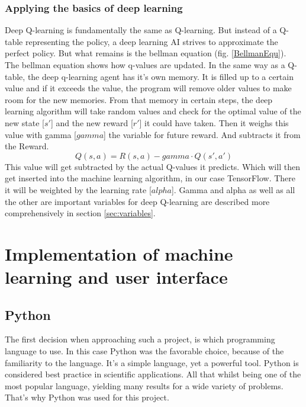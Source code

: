 \documentclass[12pt]{article}
\def\alpha{alpha}%
\def\gamma{gamma}%
\begin{document}
\subsubsection{Applying the basics of deep learning}
Deep Q-learning is fundamentally the same as Q-learning. But instead of a Q-table representing the policy, a deep learning AI strives to approximate the perfect policy. But what remains is the bellman equation (fig. \ref{BellmanEqu}). The bellman equation shows how q-values are updated. In the same way as a Q-table, the deep q-learning agent has it's own memory. It is filled up to a certain value and if it exceeds the value, the program will remove older values to make room for the new memories. From that memory in certain steps, the deep learning algorithm will take random values and check for the optimal value of the new state [$s'$] and the new reward [$r'$] it could have taken. Then it weighs this value with gamma [$\gamma$] the variable for future reward. And subtracts it from the Reward. \cite{bellmanEquValue}
\[Q(s,a) = R(s,a) - \gamma\cdot Q(s',a')\]
This value will get subtracted by the actual Q-values it predicts. Which will then get inserted into the machine learning algorithm, in our case TensorFlow. There it will be weighted by the learning rate [$\alpha$]. Gamma and alpha as well as all the other are important variables for deep Q-learning are described more comprehensively in section \ref{sec:variables}.

\section{Implementation of machine learning and user interface}
\subsection{Python}
The first decision when approaching such a project, is which programming language to use. In this case Python was the favorable choice, because of the familiarity to the language. It's a simple language, yet a powerful tool. Python is considered best practice in scientific applications. All that whilst being one of the most popular language, yielding many results for a wide variety of problems. That's why Python was used for this project. \cite{Python}
\end{document}
